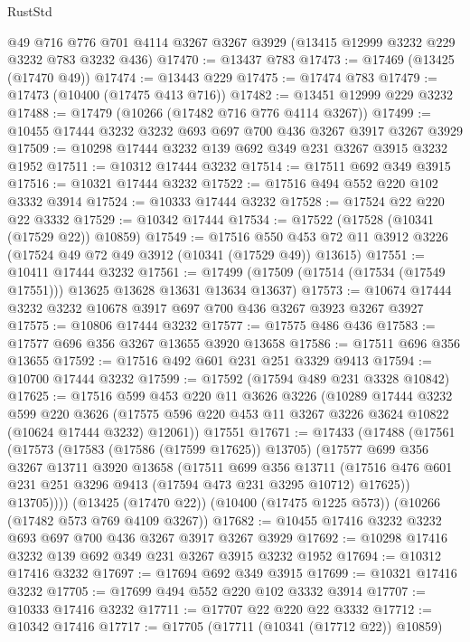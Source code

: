 \begin{lexlean}{RustStd}
\begin{coremodule}
{\begin{coremodule}
{{{{{{{{{{{{{{{{{{{{{{{{{    @49
    @716
    @776
    @701
    @4114
    @3267
    @3267
    @3929
    (@13415 @12999 @3232 @229 @3232 @783 @3232 @436)
@17470 := @13437 @783
@17473 := @17469 (@13425 (@17470 @49))
@17474 := @13443 @229
@17475 := @17474 @783
@17479 := @17473 (@10400 (@17475 @413 @716))
@17482 := @13451 @12999 @229 @3232
@17488 := @17479 (@10266 (@17482 @716 @776 @4114 @3267))
@17499 := @10455 @17444 @3232 @3232 @693 @697 @700 @436 @3267 @3917 @3267 @3929
@17509 := @10298 @17444 @3232 @139 @692 @349 @231 @3267 @3915 @3232 @1952
@17511 := @10312 @17444 @3232
@17514 := @17511 @692 @349 @3915
@17516 := @10321 @17444 @3232
@17522 := @17516 @494 @552 @220 @102 @3332 @3914
@17524 := @10333 @17444 @3232
@17528 := @17524 @22 @220 @22 @3332
@17529 := @10342 @17444
@17534 := @17522 (@17528 (@10341 (@17529 @22)) @10859)
@17549 := @17516
    @550
    @453
    @72
    @11
    @3912
    @3226
    (@17524 @49 @72 @49 @3912 (@10341 (@17529 @49)) @13615)
@17551 := @10411 @17444 @3232
@17561 := @17499 (@17509 (@17514 (@17534 (@17549 @17551))) @13625 @13628 @13631 @13634 @13637)
@17573 := @10674 @17444 @3232 @3232 @10678 @3917 @697 @700 @436 @3267 @3923 @3267 @3927
@17575 := @10806 @17444 @3232
@17577 := @17575 @486 @436
@17583 := @17577 @696 @356 @3267 @13655 @3920 @13658
@17586 := @17511 @696 @356 @13655
@17592 := @17516 @492 @601 @231 @251 @3329 @9413
@17594 := @10700 @17444 @3232
@17599 := @17592 (@17594 @489 @231 @3328 @10842)
@17625 := @17516
    @599
    @453
    @220
    @11
    @3626
    @3226
    (@10289
      @17444
      @3232
      @599
      @220
      @3626
      (@17575 @596 @220 @453 @11 @3267 @3226 @3624 @10822 (@10624 @17444 @3232) @12061))
    @17551
@17671 := @17433
    (@17488
      (@17561
        (@17573
          (@17583 (@17586 (@17599 @17625)) @13705)
          (@17577
            @699
            @356
            @3267
            @13711
            @3920
            @13658
            (@17511
              @699
              @356
              @13711
              (@17516 @476 @601 @231 @251 @3296 @9413 (@17594 @473 @231 @3295 @10712) @17625))
            @13705))))
    (@13425 (@17470 @22))
    (@10400 (@17475 @1225 @573))
    (@10266 (@17482 @573 @769 @4109 @3267))
@17682 := @10455 @17416 @3232 @3232 @693 @697 @700 @436 @3267 @3917 @3267 @3929
@17692 := @10298 @17416 @3232 @139 @692 @349 @231 @3267 @3915 @3232 @1952
@17694 := @10312 @17416 @3232
@17697 := @17694 @692 @349 @3915
@17699 := @10321 @17416 @3232
@17705 := @17699 @494 @552 @220 @102 @3332 @3914
@17707 := @10333 @17416 @3232
@17711 := @17707 @22 @220 @22 @3332
@17712 := @10342 @17416
@17717 := @17705 (@17711 (@10341 (@17712 @22)) @10859)
}}}}}}}}}}}}}}}}}}}}}}}}}
\end{coremodule}}
\end{coremodule}
\end{lexlean}
